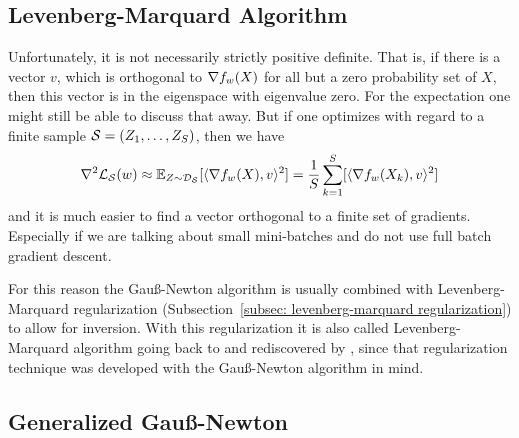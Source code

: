 \subsection{Levenberg-Marquard Algorithm}

Unfortunately, it is not necessarily strictly positive definite. That is, if there
is a vector \(v\), which is orthogonal to \(\nabla f_{w}(X)\) for all but a
zero probability set of \(X\), then this vector is in the eigenspace with
eigenvalue zero. For the expectation one might still be able to discuss that
away. But if one optimizes with regard to a finite sample
\(\mathcal{S}=(Z_1,\dots,Z_S)\), then we have
\begin{align*}
	\nabla^2\mathcal{L}_{\mathcal{S}}(w)
	\approx \mathbb{E}_{Z\sim\mathcal{D}_{\mathcal{S}}}[\langle \nabla f_{w}(X), v\rangle^2]
	= \frac1{S}\sum_{k=1}^S [\langle \nabla f_{w}(X_k), v\rangle^2]
\end{align*}
and it is much easier to find a vector orthogonal to a finite set of gradients.
Especially if we are talking about small mini-batches and do not use full batch
gradient descent.

For this reason the Gauß-Newton algorithm is usually combined with
Levenberg-Marquard regularization (Subsection~\ref{subsec: levenberg-marquard
regularization}) to allow for inversion. With this regularization it is also
called Levenberg-Marquard algorithm going back to
\textcite{levenbergMethodSolutionCertain1944} and rediscovered by
\textcite{marquardtAlgorithmLeastSquaresEstimation1963}, since that
regularization technique was developed with the Gauß-Newton algorithm in
mind.

\subsection{Generalized Gauß-Newton}

